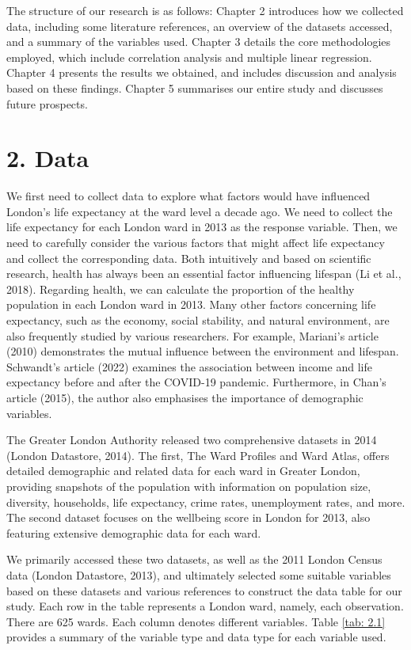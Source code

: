 \documentclass[a4paper,12pt]{article}
\begin{document}
The structure of our research is as follows: Chapter 2 introduces how we collected data, including some literature references, an overview of the datasets accessed, and a summary of the variables used. Chapter 3 details the core methodologies employed, which include correlation analysis and multiple linear regression. Chapter 4 presents the results we obtained, and includes discussion and analysis based on these findings. Chapter 5 summarises our entire study and discusses future prospects.





\section*{2. Data}
We first need to collect data to explore what factors would have influenced London's life expectancy at the ward level a decade ago. We need to collect the life expectancy for each London ward in 2013 as the response variable. Then, we need to carefully consider the various factors that might affect life expectancy and collect the corresponding data. Both intuitively and based on scientific research, health has always been an essential factor influencing lifespan (Li et al., 2018). Regarding health, we can calculate the proportion of the healthy population in each London ward in 2013. Many other factors concerning life expectancy, such as the economy, social stability, and natural environment, are also frequently studied by various researchers. For example, Mariani's article (2010) demonstrates the mutual influence between the environment and lifespan. Schwandt's article (2022) examines the association between income and life expectancy before and after the COVID-19 pandemic. Furthermore, in Chan's article (2015), the author also emphasises the importance of demographic variables.

The Greater London Authority released two comprehensive datasets in 2014 (London Datastore, 2014). The first, The Ward Profiles and Ward Atlas, offers detailed demographic and related data for each ward in Greater London, providing snapshots of the population with information on population size, diversity, households, life expectancy, crime rates, unemployment rates, and more. The second dataset focuses on the wellbeing score in London for 2013, also featuring extensive demographic data for each ward.

We primarily accessed these two datasets, as well as the 2011 London Census data (London Datastore, 2013), and ultimately selected some suitable variables based on these datasets and various references to construct the data table for our study. Each row in the table represents a London ward, namely, each observation. There are 625 wards. Each column denotes different variables. Table \ref{tab: 2.1} provides a summary of the variable type and data type for each variable used.
\end{document}
